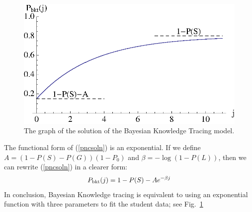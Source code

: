 \documentclass[11pt,letterpaper]{article}
\begin{document}
\begin{tabular}
\begin{figure}
  \centering \includegraphics{exponential.eps}
   \caption{The graph of the solution of the Bayesian Knowledge
     Tracing model.}
    \label{bkt-function}
\end{figure}

The functional form of (\ref{pncsoln}) is an exponential.
If we define 
$A=\left(1-P(S)-P(G)\right) \left(1-P_0\right)$ and
$\beta=-\log(1-P(L))$, then we can rewrite (\ref{pncsoln}) in 
a clearer form:
%
\begin{equation}
         P_{\rm bkt}(j) = 1-P(S) -A e^{-\beta j}
\end{equation}
%
In conclusion, Bayesian Knowledge tracing is equivalent to using
an exponential function with three parameters to fit the student data;
see Fig.~\ref{bkt-function}


%
%




\end{tabular}
\end{document}
